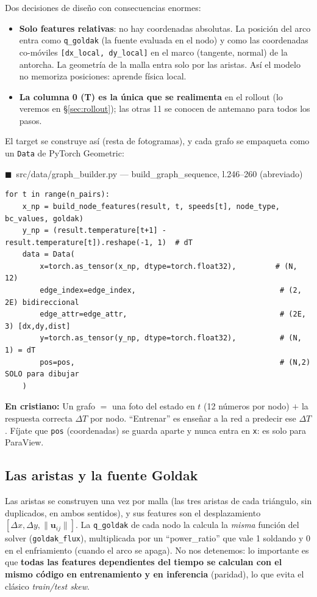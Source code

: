 \documentclass[11pt]{article}
\theoremstyle{definition}
\theoremstyle{plain}
\newcommand{\dummies}[1]{%
  \par\smallskip\noindent
  \colorbox{yellow!18}{\parbox{\dimexpr\linewidth-2\fboxsep}{%
  \small\textbf{En cristiano:} #1}}\par\smallskip}
\newcommand{\srcref}[1]{\par\smallskip\noindent
  {\footnotesize\ttfamily\textcolor{srcblue}{$\blacksquare$\ #1}}\par\vspace{1pt}}
\begin{document}
Dos decisiones de diseño con consecuencias enormes:
\begin{itemize}[leftmargin=1.4em]
  \item \textbf{Solo features relativas}: no hay coordenadas absolutas. La posición
  del arco entra como \texttt{q\_goldak} (la fuente evaluada en el nodo) y como las
  coordenadas co-móviles \texttt{[dx\_local, dy\_local]} en el marco
  (tangente, normal) de la antorcha. La geometría de la malla entra solo por las
  aristas. Así el modelo no memoriza posiciones: aprende física local.
  \item \textbf{La columna 0 (T) es la única que se realimenta} en el rollout (lo
  veremos en §\ref{sec:rollout}); las otras 11 se conocen de antemano para todos
  los pasos.
\end{itemize}

El target se construye así (resta de fotogramas), y cada grafo se empaqueta como un
\texttt{Data} de PyTorch Geometric:

\srcref{src/data/graph\_builder.py — build\_graph\_sequence, l.246--260 (abreviado)}
\begin{lstlisting}
for t in range(n_pairs):
    x_np = build_node_features(result, t, speeds[t], node_type, bc_values, goldak)
    y_np = (result.temperature[t+1] - result.temperature[t]).reshape(-1, 1)  # dT
    data = Data(
        x=torch.as_tensor(x_np, dtype=torch.float32),         # (N, 12)
        edge_index=edge_index,                                 # (2, 2E) bidireccional
        edge_attr=edge_attr,                                   # (2E, 3) [dx,dy,dist]
        y=torch.as_tensor(y_np, dtype=torch.float32),          # (N, 1) = dT
        pos=pos,                                               # (N,2) SOLO para dibujar
    )
\end{lstlisting}

\dummies{Un grafo $=$ una foto del estado en $t$ (12 números por nodo) $+$ la
respuesta correcta $\Delta T$ por nodo. ``Entrenar'' es enseñar a la red a predecir
ese $\Delta T$. Fíjate que \texttt{pos} (coordenadas) se guarda aparte y nunca entra
en \texttt{x}: es solo para ParaView.}

\subsection{Las aristas y la fuente Goldak}

Las aristas se construyen una vez por malla (las tres aristas de cada triángulo,
sin duplicados, en ambos sentidos), y sus features son el desplazamiento
$[\Delta x,\Delta y,\lVert\bm u_{ij}\rVert]$. La \texttt{q\_goldak} de cada nodo la
calcula la \emph{misma} función del solver (\texttt{goldak\_flux}), multiplicada por
un ``power\_ratio'' que vale 1 soldando y 0 en el enfriamiento (cuando el arco se
apaga). No nos detenemos: lo importante es que \textbf{todas las features
dependientes del tiempo se calculan con el mismo código en entrenamiento y en
inferencia} (paridad), lo que evita el clásico \emph{train/test skew}.
\end{document}
